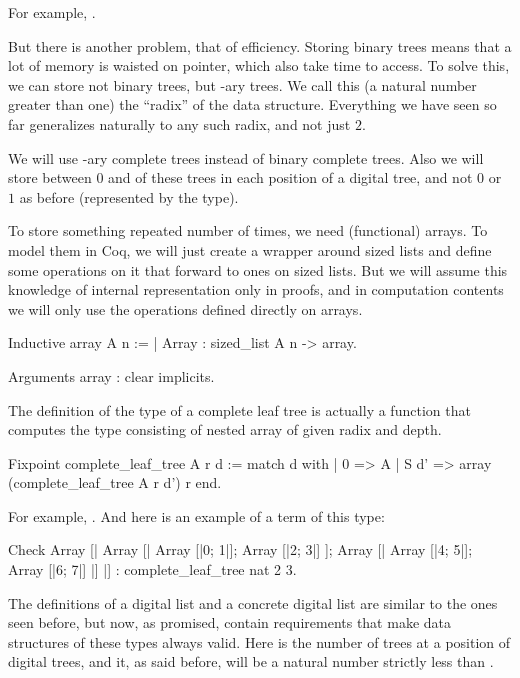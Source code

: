 \documentclass{article}
\begin{document}
For example, .

But there is another problem, that of efficiency. Storing binary trees means that a lot of memory is waisted on pointer, which also take time to access. To solve this, we can store not binary trees, but -ary trees. We call this  (a natural number greater than one) the ``radix'' of the data structure. Everything we have seen so far generalizes naturally to any such radix, and not just $2$.

We will use -ary complete trees instead of binary complete trees. Also we will store between $0$ and  of these trees in each position of a digital tree, and not $0$ or $1$ as before (represented by the  type).

To store something repeated number of times, we need (functional) arrays. To model them in Coq, we will just create a wrapper around sized lists and define some operations on it that forward to ones on sized lists. But we will assume this knowledge of internal representation only in proofs, and in computation contents we will only use the operations defined directly on arrays.

\begin{coq}
Inductive array {A n} :=
  | Array : sized_list A n -> array.

Arguments array : clear implicits.
\end{coq}

The definition of the type of a complete leaf tree is actually a function that computes the type consisting of nested array of given radix and depth.

\begin{coq}
Fixpoint complete_leaf_tree A r d :=
  match d with
  | 0 => A
  | S d' => array (complete_leaf_tree A r d') r
  end.
\end{coq}

For example, . And here is an example of a term of this type:

\begin{coq}
Check
    Array [|
        Array [|
            Array [|0; 1|];
            Array [|2; 3|]
        ];
        Array [|
            Array [|4; 5|];
            Array [|6; 7|]
        |]
    |]
    : complete_leaf_tree nat 2 3.
\end{coq}

The definitions of a digital list and a concrete digital list are similar to the ones seen before, but now, as promised, contain requirements that make data structures of these types always valid. Here  is the number of trees at a position of digital trees, and it, as said before, will be a natural number strictly less than .
\end{document}
